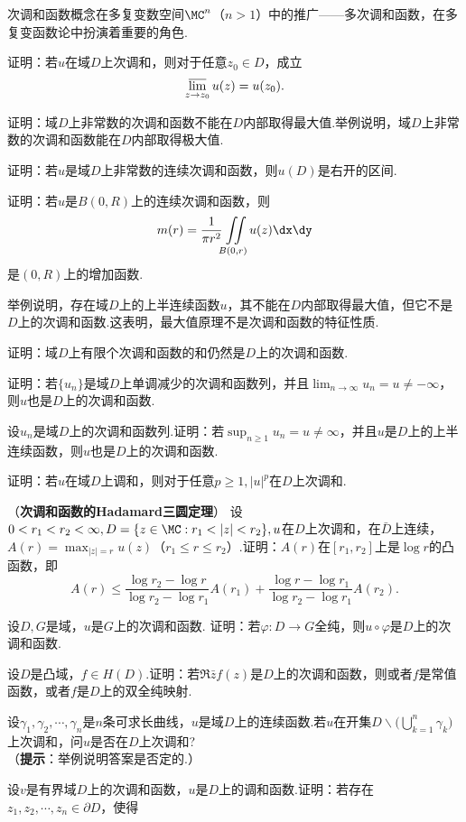 次调和函数概念在多复变数空间$\MC^n$（$n>1$）中的推广——多次调和函数，在多复变函数论中扮演着重要的角色.
\begin{xiti}
\item 证明：若$u$在域$D$上次调和，则对于任意$z_0\in D$，成立
\[\varlimsup_{z\to z_0}u(z)=u(z_0).\]
\item 证明：域$D$上非常数的次调和函数不能在$D$内部取得最大值.举例说明，域$D$上非常数的次调和函数能在$D$内部取得极大值.
\item 证明：若$u$是域$D$上非常数的连续次调和函数，则$u(D)$是右开的区间.
\item 证明：若$u$是$B(0,R)$上的连续次调和函数，则
\[m(r)=\frac1{\pi r^2}\iint\limits_{B(0,r)}u(z)\dx\dy\]
是$(0,R)$上的增加函数.
\item 举例说明，存在域$D$上的上半连续函数$u$，其不能在$D$内部取得最大值，但它不是$D$上的次调和函数.这表明，最大值原理不是次调和函数的特征性质.
\item 证明：域$D$上有限个次调和函数的和仍然是$D$上的次调和函数.
\item 证明：若$\{u_n\}$是域$D$上单调减少的次调和函数列，并且$\lim_{n\to\infty}u_n=u\ne-\infty$，则$u$也是$D$上的次调和函数.
\item 设${u_n}$是域$D$上的次调和函数列.证明：若$\sup_{n\ge1}u_n=u\ne\infty$，并且$u$是$D$上的上半连续函数，则$u$也是$D$上的次调和函数.
\item 证明：若$u$在域$D$上调和，则对于任意$p\ge1,|u|^p$在$D$上次调和.
\item （\textbf{次调和函数的Hadamard三圆定理}）
设$0<r_1<r_2<\infty,D=\{z\in\MC:r_1<|z|<r_2\},u$在$D$上次调和，在$\bar D$上连续，$A(r)=\max_{|z|=r}u(z)$（$r_1\le r\le r_2$）.证明：$A(r)$在$[r_1,r_2]$上是$\log r$的凸函数，即
\[A(r)\le\frac{\log r_2-\log r}{\log r_2-\log r_1}A(r_1)+\frac{\log r-\log r_1}
{\log r_2-\log r_1}A(r_2).\]
\item 设$D,G$是域，$u$是$G$上的次调和函数. 证明：若$\varphi:D\to G$全纯，则$u\circ \varphi$是$D$上的次调和函数.
\item 设$D$是凸域，$f\in H(D)$.证明：若$\Re\bar zf(z)$是$D$上的次调和函数，则或者$f$是常值函数，或者$f$是$D$上的双全纯映射.
\item 设$\gamma_1,\gamma_2,\cdots,\gamma_n$是$n$条可求长曲线，$u$是域$D$上的连续函数.若$u$在开集$D\backslash\big(\bigcup_{k=1}^n\gamma_k\big)$上次调和，问$u$是否在$D$上次调和?\\
（\textbf{提示}：举例说明答案是否定的.）
\item 设$v$是有界域$D$上的次调和函数，$u$是$D$上的调和函数.证明：若存在$z_1,z_2,\cdots,z_n\in\partial D $，使得

\end{xiti}

